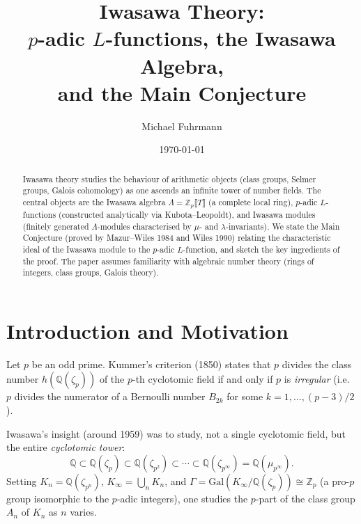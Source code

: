 \documentclass[12pt,a4paper]{amsart}
\theoremstyle{definition}
\newcommand{\Q}{\mathbb{Q}}
\newcommand{\Zp}{\mathbb{Z}_p}
\newcommand{\Gal}{\mathrm{Gal}}
\newcommand{\cylp}{\mathbb{Q}(\mu_{p^\infty})}
\begin{document}

\title{Iwasawa Theory:\\
       $p$-adic $L$-functions, the Iwasawa Algebra,\\
       and the Main Conjecture}

\author{Michael Fuhrmann}
\address{Specialist Mathematics Project, Build 119}
\date{\today}

\begin{abstract}
Iwasawa theory studies the behaviour of arithmetic objects (class groups,
Selmer groups, Galois cohomology) as one ascends an infinite tower of number
fields.  The central objects are the Iwasawa algebra $\Lambda = \Zp\llbracket T \rrbracket$
(a complete local ring), $p$-adic $L$-functions (constructed analytically
via Kubota--Leopoldt), and Iwasawa modules (finitely generated $\Lambda$-modules
characterised by $\mu$- and $\lambda$-invariants).  We state the Main Conjecture
(proved by Mazur--Wiles 1984 and Wiles 1990) relating the characteristic ideal of the
Iwasawa module to the $p$-adic $L$-function, and sketch the key ingredients
of the proof.  The paper assumes familiarity with algebraic number theory
(rings of integers, class groups, Galois theory).
\end{abstract}

\maketitle
\tableofcontents

\section{Introduction and Motivation}

Let $p$ be an odd prime.  Kummer's criterion (1850) states that $p$ divides the
class number $h(\Q(\zeta_p))$ of the $p$-th cyclotomic field if and only if
$p$ is \emph{irregular} (i.e.\ $p$ divides the numerator of a Bernoulli number
$B_{2k}$ for some $k = 1, \ldots, (p-3)/2$).

Iwasawa's insight (around 1959) was to study, not a single cyclotomic field,
but the entire \emph{cyclotomic tower}:
\[
  \Q \subset \Q(\zeta_p) \subset \Q(\zeta_{p^2}) \subset \cdots
  \subset \Q(\zeta_{p^\infty}) = \cylp.
\]
Setting $K_n = \Q(\zeta_{p^n})$, $K_\infty = \bigcup_n K_n$, and
$\Gamma = \Gal(K_\infty/\Q(\zeta_p)) \cong \Zp$ (a pro-$p$ group isomorphic
to the $p$-adic integers), one studies the $p$-part of the class group $A_n$
of $K_n$ as $n$ varies.
\end{document}
